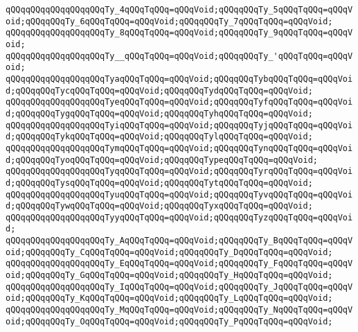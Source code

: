 \verb|qQQqqQQqqQQqqQQqqQQqTy_4qQQqTqQQq=qQQqVoid;qQQqqQQqTy_5qQQqTqQQq=qQQqVoid;qQQqqQQqTy_6qQQqTqQQq=qQQqVoid;qQQqqQQqTy_7qQQqTqQQq=qQQqVoid;|\newline
\verb|qQQqqQQqqQQqqQQqqQQqTy_8qQQqTqQQq=qQQqVoid;qQQqqQQqTy_9qQQqTqQQq=qQQqVoid;|\newline
\newline
\verb|qQQqqQQqqQQqqQQqqQQqTy__qQQqTqQQq=qQQqVoid;qQQqqQQqTy_'qQQqTqQQq=qQQqVoid;|\newline
\newline
\verb|qQQqqQQqqQQqqQQqqQQqTyaqQQqTqQQq=qQQqVoid;qQQqqQQqTybqQQqTqQQq=qQQqVoid;qQQqqQQqTycqQQqTqQQq=qQQqVoid;qQQqqQQqTydqQQqTqQQq=qQQqVoid;|\newline
\verb|qQQqqQQqqQQqqQQqqQQqTyeqQQqTqQQq=qQQqVoid;qQQqqQQqTyfqQQqTqQQq=qQQqVoid;qQQqqQQqTygqQQqTqQQq=qQQqVoid;qQQqqQQqTyhqQQqTqQQq=qQQqVoid;|\newline
\verb|qQQqqQQqqQQqqQQqqQQqTyiqQQqTqQQq=qQQqVoid;qQQqqQQqTyjqQQqTqQQq=qQQqVoid;qQQqqQQqTykqQQqTqQQq=qQQqVoid;qQQqqQQqTylqQQqTqQQq=qQQqVoid;|\newline
\verb|qQQqqQQqqQQqqQQqqQQqTymqQQqTqQQq=qQQqVoid;qQQqqQQqTynqQQqTqQQq=qQQqVoid;qQQqqQQqTyoqQQqTqQQq=qQQqVoid;qQQqqQQqTypeqQQqTqQQq=qQQqVoid;|\newline
\verb|qQQqqQQqqQQqqQQqqQQqTyqqQQqTqQQq=qQQqVoid;qQQqqQQqTyrqQQqTqQQq=qQQqVoid;qQQqqQQqTysqQQqTqQQq=qQQqVoid;qQQqqQQqTytqQQqTqQQq=qQQqVoid;|\newline
\verb|qQQqqQQqqQQqqQQqqQQqTyuqQQqTqQQq=qQQqVoid;qQQqqQQqTyvqQQqTqQQq=qQQqVoid;qQQqqQQqTywqQQqTqQQq=qQQqVoid;qQQqqQQqTyxqQQqTqQQq=qQQqVoid;|\newline
\verb|qQQqqQQqqQQqqQQqqQQqTyyqQQqTqQQq=qQQqVoid;qQQqqQQqTyzqQQqTqQQq=qQQqVoid;|\newline
\newline
\verb|qQQqqQQqqQQqqQQqqQQqTy_AqQQqTqQQq=qQQqVoid;qQQqqQQqTy_BqQQqTqQQq=qQQqVoid;qQQqqQQqTy_CqQQqTqQQq=qQQqVoid;qQQqqQQqTy_DqQQqTqQQq=qQQqVoid;|\newline
\verb|qQQqqQQqqQQqqQQqqQQqTy_EqQQqTqQQq=qQQqVoid;qQQqqQQqTy_FqQQqTqQQq=qQQqVoid;qQQqqQQqTy_GqQQqTqQQq=qQQqVoid;qQQqqQQqTy_HqQQqTqQQq=qQQqVoid;|\newline
\verb|qQQqqQQqqQQqqQQqqQQqTy_IqQQqTqQQq=qQQqVoid;qQQqqQQqTy_JqQQqTqQQq=qQQqVoid;qQQqqQQqTy_KqQQqTqQQq=qQQqVoid;qQQqqQQqTy_LqQQqTqQQq=qQQqVoid;|\newline
\verb|qQQqqQQqqQQqqQQqqQQqTy_MqQQqTqQQq=qQQqVoid;qQQqqQQqTy_NqQQqTqQQq=qQQqVoid;qQQqqQQqTy_OqQQqTqQQq=qQQqVoid;qQQqqQQqTy_PqQQqTqQQq=qQQqVoid;|\newline
